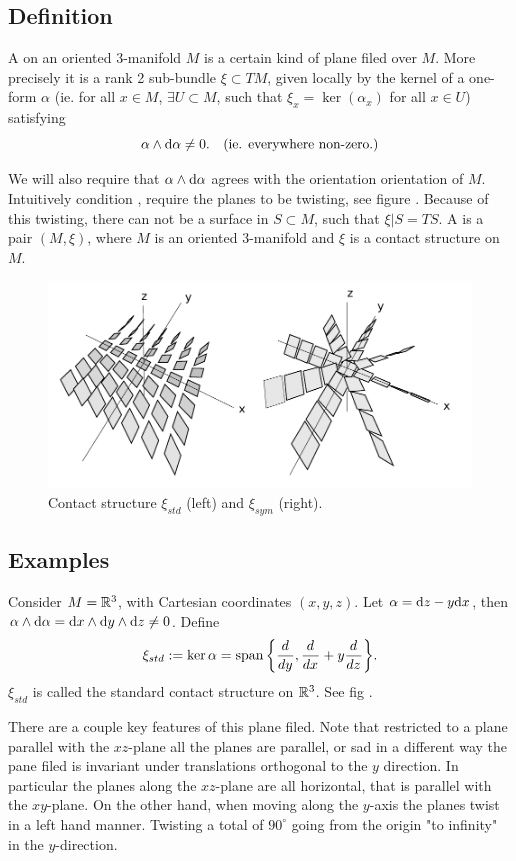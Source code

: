 

\subsection{Definition}

A  on an oriented 3-manifold $M$ is a certain kind of
plane filed over $M$. More precisely it is a rank 2 sub-bundle $\xi \subset TM$,
given locally by the kernel of a one-form $\alpha$ (ie. for all $x\in M$,
$\exists U \subset M$, such that $\xi_x = \ker(\alpha_x)$ for all $x\in U$)
satisfying 
\begin{equation} 
\label{eq:alpha_non_zero}
\alpha \wedge \mathrm{d} \alpha \ne 0. \quad \text{(ie. everywhere non-zero.)}
\end{equation}

We will also require that $\alpha \wedge \mathrm{d} \alpha$ agrees with the orientation
orientation of $M$.
Intuitively condition , require the planes to be
twisting, see figure . Because of this twisting, there
can not be a surface in $S \subset M$, such that $\xi|S = TS$. 
A  is a pair $(M,\xi)$, where $M$ is an oriented
3-manifold and $\xi$ is a contact structure on $M$.

\begin{figure}
\centering
\includegraphics[width=.4\textwidth]{figs/stand_contact.pdf}
\caption{Contact structure $\xi_{std}$ (left) and $\xi_{sym}$ (right). }
\label{fig:stand_contact}
\end{figure}

\subsection{Examples}

\begin{exmp}
Consider $M = \mathbb{R}^3$, with Cartesian coordinates $(x,y,z)$. Let $\alpha = \mathrm{d} z -
y \mathrm{d} x$, then $\alpha \wedge \mathrm{d} \alpha = \mathrm{d} x \wedge \mathrm{d} y \wedge \mathrm{d} z \ne 0$.
Define 
\[ \xi_{std} := \operatorname{ker}{\alpha} = \operatorname{span}\qty{  \ensuremath{\frac{d^{} {}}{d {y}^{}}},  \ensuremath{\frac{d^{} {}}{d {x}^{}}} + y  \ensuremath{\frac{d^{} {}}{d {z}^{}}} }. \]
$\xi_{std}$ is called the standard contact structure on $\mathbb{R}^3$. See fig
.
\end{exmp} 
There are a couple key features of this plane filed. 
Note that restricted to a plane parallel with the $xz$-plane all the planes are
parallel, or sad in a different way the pane filed is invariant under
translations orthogonal to the $y$ direction. In particular the planes along the
$xz$-plane are all horizontal, that is parallel with the $xy$-plane. On the
other hand, when moving along the $y$-axis the planes twist in a left hand
manner. Twisting a total of $90^\circ$ going from the origin "to infinity" in
the $y$-direction. 

